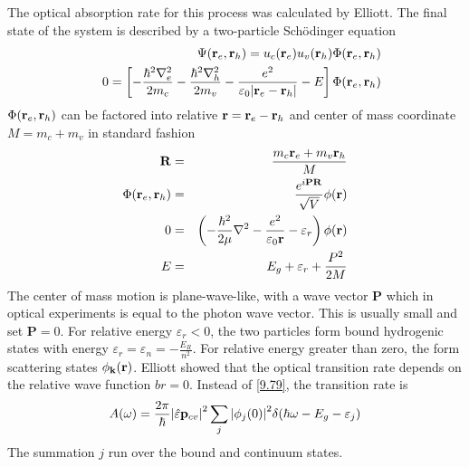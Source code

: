 The optical absorption rate for this process was calculated by Elliott. The final state of the system is described by a two-particle Sch{\"o}dinger equation
\begin{eqnarray}
    &&\Psi(\mathbf{r}_e,\mathbf{r}_h) = u_c(\mathbf{r}_e) u_v(\mathbf{r}_h) \Phi(\mathbf{r}_e,\mathbf{r}_h)     \label{9.82}    \\
    &&0 =\left[ - \frac{\hbar^2\nabla_e^2}{2m_c} - \frac{\hbar^2\nabla_h^2}{2m_v}  - \frac{e^2}{\varepsilon_0 \abs{\mathbf{r}_e-\mathbf{r}_h}} -E  \right] \Phi(\mathbf{r}_e,\mathbf{r}_h)   \label{9.83}
\end{eqnarray}
$\Phi(\mathbf{r}_e,\mathbf{r}_h)$ can be factored into relative $\mathbf{r} = \mathbf{r}_e-\mathbf{r}_h$ and center of mass coordinate $M=m_c+m_v$ in standard fashion
\begin{eqnarray}
    \mathbf{R} &=& \frac{m_c \mathbf{r}_e+m_v \mathbf{r}_h}{M}        \label{9.84} \\
    \Phi(\mathbf{r}_e,\mathbf{r}_h) &=& \frac{e^{i\mathbf{PR}}}{\sqrt{V}} \phi(\mathbf{r})    \label{9.85} \\
    0 &=& \left( - \frac{\hbar^2}{2\mu} \nabla^2 - \frac{e^2}{\varepsilon_0 \mathbf{r}} -\varepsilon_r \right) \phi(\mathbf{r})       \label{9.86} \\
    E &=& E_g + \varepsilon_r + \frac{P^2}{2M}  \label{9.87}
\end{eqnarray}
The center of mass motion is plane-wave-like, with a wave vector $\mathbf{P}$ which in optical experiments is equal to the photon wave vector.
This is usually small and set $\mathbf{P}=0$.
For relative energy $\varepsilon_r<0$, the two particles form bound hydrogenic states with energy $\varepsilon_r = \varepsilon_n = - \frac{E_R}{n^2} $.  For relative energy greater than zero, the form scattering states $\phi_{\mathbf{k}}(\mathbf{r})$.
Elliott showed that the optical transition rate depends on the relative wave function $br=0$.
Instead of \eqref{9.79}, the transition rate is
\begin{equation}
    A(\omega) = \frac{2\pi}{\hbar} \abs{\hat{\varepsilon} \mathbf{p}_{cv}}^2 \sum_j \abs{\phi_j(0)}^2 \delta(\hbar \omega - E_g -\varepsilon_j)  \label{9.88}
\end{equation}
The summation $j$ run over the bound and continuum states.


